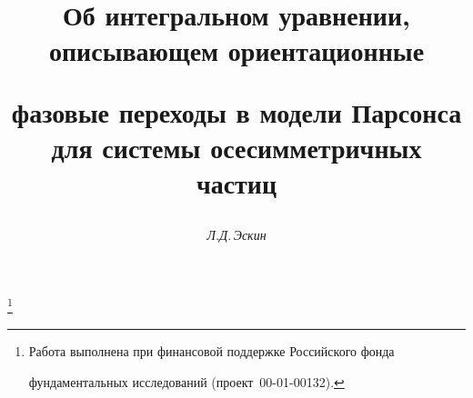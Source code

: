 




%





\newcommand{\tts}[1]{} 


\renewcommand{\baselinestretch}{0.97}







\setcounter{page}{78}















\author{\it Л.Д.\,Эскин}




\title{Об интегральном уравнении, описывающем ориентационные


фазовые переходы в модели Парсонса для системы осесимметричных частиц}


\thanks{Работа выполнена при финансовой поддержке Российского фонда


фундаментальных исследований (проект \No\,00-01-00132).}





\date{}




\pagestyle{plain} %







\maketitle


